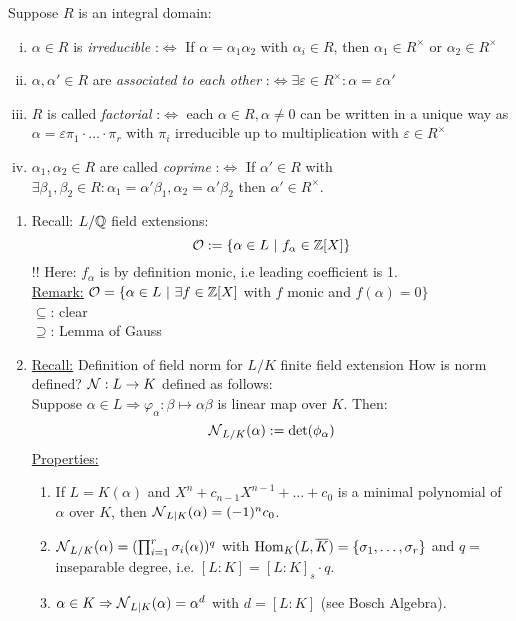 \begin{remin}
Suppose $R$ is an integral domain:
\begin{enumerate}[i)]
\item $\alpha \in R$ is \emph{irreducible} :$\iff$ If $\alpha=\alpha_1 \alpha_2$ with $\alpha_i \in R$, then $\alpha_1 \in R^\times$ or $\alpha_2 \in R^\times$
\item $\alpha, \alpha' \in R$ are \emph{associated to each other} :$\iff \exists \varepsilon \in R^\times: \alpha = \varepsilon \alpha'$
\item $R$ is called \emph{factorial} :$\iff$ each $\alpha \in R, \alpha\neq 0$ can be written in a unique way as\\
$\alpha = \varepsilon \pi_1 \cdot \ldots \cdot \pi_r$ with $\pi_i$ irreducible up to multiplication with $\varepsilon \in R^\times$
\item $\alpha_1, \alpha_2 \in R$ are called \emph{coprime} :$\iff$ If $\alpha' \in R$ with $\exists \beta_1, \beta_2 \in R: \alpha_1=\alpha'\beta_1, \alpha_2=\alpha'\beta_2$ then $\alpha' \in R^\times$.
\end{enumerate}
\end{remin}

\begin{Bem*}
\begin{enumerate}
\item 
Recall: $L/\mathbb{Q}$ field extensions:
\[ \mathcal{O} :=\{\alpha \in L \ | \ f_\alpha \in \mathbb{Z}[X]\}\]
!! Here: $f_\alpha$ is by definition monic, i.e leading coefficient is 1.\\
\underline{Remark:} $\O=\{\alpha \in L \ | \ \exists f \in \Z[X]$ with $f$ monic and $f(\alpha)=0\}$\\
\glqq $\subseteq$\grqq: clear\\
\glqq $\supseteq$\grqq: Lemma of Gauss
\item \underline{Recall:} Definition of field norm for $L / K$ finite field extension
How is norm defined? $\operatorname{\mathcal{N}}: L \to K$ defined as follows:\\
Suppose $\alpha \in L \Rightarrow \varphi_\alpha: \beta \mapsto \alpha \beta$ is linear map over $K$. Then:
\[\operatorname{\mathcal{N}}_{L/K}(\alpha) := \det (\phi_\alpha)\]
\underline{Properties:}
\begin{enumerate}
\item If $L= K(\alpha)$ and $X^n+c_{n-1}X^{n-1}+\dots+c_0$ is a minimal polynomial of $\alpha$ over $K$, then $\operatorname{\mathcal{N}}_{L|K}(\alpha) = (-1)^n c_0$.\\
\item $\operatorname{\mathcal{N}}_{L/K}(\alpha)=(\prod_{i=1}^r \sigma_i(\alpha))^q$ with $\operatorname{Hom}_K(L, \overline K)= \{\sigma_1, \dots, \sigma_r\}$ and $q=$ inseparable degree, i.e. $[L:K]=[L:K]_s \cdot q$.
\item $\alpha \in K \Rightarrow \operatorname{\mathcal{N}}_{L|K}(\alpha)=\alpha^d$ with $d = [L:K]$ (see Bosch \glqq Algebra).
\end{enumerate}
\end{enumerate}
\end{Bem*}

